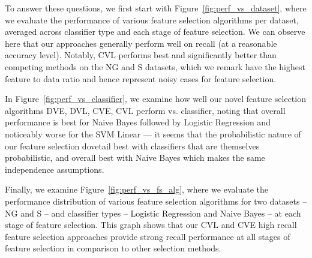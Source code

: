 To answer these questions, we first start with
Figure~\ref{fig:perf_vs_dataset}, where we evaluate the performance of
various feature selection algorithms per dataset, averaged across
classifier type and each stage of feature selection. We can observe
here that our approaches generally perform well on recall (at a
reasonable accuracy level).  Notably, CVL performs best and
significantly better than competing methods on the NG and S datasets,
which we remark have the highest feature to data ratio and hence 
represent noisy cases for feature selection.  


In Figure~\ref{fig:perf_vs_classifier}, we examine how well our 
novel feature selection algorithms DVE, DVL, CVE, CVL 
perform vs. classifier, noting that overall performance is best
for Naive Bayes followed by Logistic Regression and noticeably worse for
the SVM Linear --- it seems that the probabilistic nature of our feature selection
dovetail best with classifiers that are themselves probabilistic,
and overall best with Naive Bayes which makes the same independence assumptions.

Finally, we examine Figure~\ref{fig:perf_vs_fs_alg}, where we evaluate the
performance distribution of various feature selection algorithms for
two datasets -- NG and S -- and classifier types -- Logistic
Regression and Naive Bayes -- at each stage of feature selection.
This graph shows that our CVL and CVE high recall feature selection
approaches provide strong recall performance at all stages of
feature selection in comparison to other selection methods.

